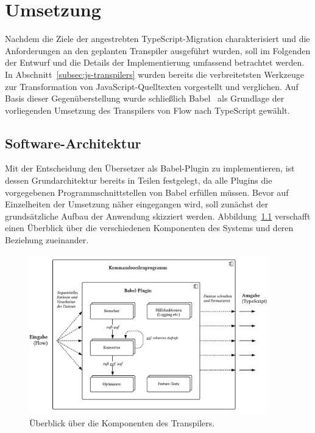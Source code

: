 \chapter{Umsetzung}
\label{chap:implementation}

Nachdem die Ziele der angestrebten TypeScript-Migration charakterisiert und die Anforderungen an den geplanten Transpiler ausgeführt wurden, soll im Folgenden der Entwurf und die Details der Implementierung umfassend betrachtet werden. In Abschnitt~\ref{subsec:js-transpilers} wurden bereits die verbreitetsten Werkzeuge zur Transformation von JavaScript-Quelltexten vorgestellt und verglichen. Auf Basis dieser Gegenüberstellung wurde schließlich Babel~\autocite{BABEL} als Grundlage der vorliegenden Umsetzung des Transpilers von Flow nach TypeScript gewählt.

\section{Software-Architektur}
\label{sec:software-architecture}

Mit der Entscheidung den Übersetzer als Babel-Plugin zu implementieren, ist dessen Grundarchitektur bereits in Teilen festgelegt, da alle Plugins die vorgegebenen Programmschnittstellen von Babel erfüllen müssen. Bevor auf Einzelheiten der Umsetzung näher eingegangen wird, soll zunächst der grundsätzliche Aufbau der Anwendung skizziert werden. Abbildung~\ref{fig:architecture-overview} verschafft einen Überblick über die verschiedenen Komponenten des Systems und deren Beziehung zueinander.

\begin{figure}[tbp]
  \centering
  \includegraphics[width=0.92\textwidth]{src/4_Umsetzung/fig/architecture-overview.pdf}
  \caption{Überblick über die Komponenten des Transpilers.}
  \label{fig:architecture-overview}
\end{figure}

